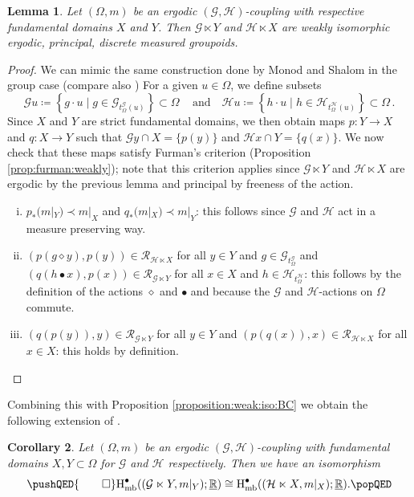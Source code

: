\documentclass[11pt, oneside]{amsart}
\newtheorem{lemma}{Lemma}[section]
\newtheorem{cor}[lemma]{Corollary}
\theoremstyle{definition}
\theoremstyle{remark}
\theoremstyle{TheoremNum}
\newcommand{\Hmb}{\textup{H}_{\textup{mb}}}
\newcommand{\qand}{\quad \text{and} \quad}
\begin{document}
\begin{lemma}\label{lemma:iso}
  Let $(\Omega,m)$ be an ergodic $(\mathcal{G},\mathcal{H})$-coupling with respective fundamental domains $X$ and $Y$. Then $\mathcal{G}\ltimes Y$ and $\mathcal{H}\ltimes X$ are weakly isomorphic ergodic, principal, discrete measured groupoids.
\end{lemma}
  \begin{proof}
We can mimic the same construction done by Monod and Shalom in the group case \cite{MonShal} (compare also \cite{sarti:savini:23}) 
  For a given $u\in \Omega$, we define subsets
  $$\mathcal{G}u\coloneqq \left\{g\cdot u \mid g\in \mathcal{G}_{t_\Omega^\mathcal{G}(u)}\right\}\subset \Omega\,
 \qand \mathcal{H}u\coloneqq \left\{h\cdot u \mid h\in \mathcal{H}_{t_\Omega^\mathcal{H}(u)}\right\}\subset \Omega\,.$$
Since $X$ and $Y$ are strict fundamental domains, we then obtain maps $p:Y\to X$ and $q: X \to Y$ such that
$\mathcal{G}y\cap X = \{p(y)\}$ and $\mathcal{H}x\cap Y = \{q(x)\}$. We now check that these maps satisfy Furman's criterion (Proposition \ref{prop:furman:weakly}); note that this criterion applies since $\mathcal{G}\ltimes Y$ and $\mathcal{H}\ltimes X$ are ergodic by the previous lemma and principal by freeness of the action.
\begin{enumerate}[(i)]
  \item[(i)]$p_*(m|_Y)\prec m|_X$ and $q_*(m|_X)\prec m|_Y$: this follows since $\mathcal{G}$ and $\mathcal{H}$ act in a measure preserving way.
  \item[(ii)] $(p(g\diamond  y),p(y))\in \mathcal{R}_{\mathcal{H}\ltimes X}$ for all $y\in Y$ and $g\in \mathcal{G}_{t_\Omega^{\mathcal{G}}}$ and $(q(h\bullet  x),p(x))\in \mathcal{R}_{\mathcal{G}\ltimes Y}$ for all $x\in X$ and $h\in \mathcal{H}_{t_\Omega^{\mathcal{H}}}$: this follows by the definition of the actions $\diamond$ and $\bullet$ and because the $\mathcal{G}$ and $\mathcal{H}$-actions on $\Omega$ commute.
  \item[(iii)]  $(q(p(y)),y)\in \mathcal{R}_{\mathcal{G}\ltimes Y}$ for all $y\in Y$ and $(p(q(x)),x)\in \mathcal{R}_{\mathcal{H}\ltimes X}$ for all $x\in X$: this holds by definition.\qedhere
\end{enumerate}
  \end{proof}
  Combining this with Proposition \ref{proposition:weak:iso:BC} we obtain the following extension of \cite[Corollary 6.1]{sarti:savini:23}.
\begin{cor}\label{METwist}
 Let $(\Omega,m)$ be an ergodic $(\mathcal{G},\mathcal{H})$-coupling with fundamental domains $X,Y\subset \Omega$ for $\mathcal{G}$ and $\mathcal{H}$ respectively. Then we have an isomorphism
\[\pushQED{\qed}\Hmb^\bullet((\mathcal{G}\ltimes Y,  m|_Y); \underline{\mathbb{R}})\cong \Hmb^\bullet((\mathcal{H}\ltimes X,  m|_X);\underline{\mathbb{R}}). \qedhere\popQED\]
\end{cor}
\end{document}
